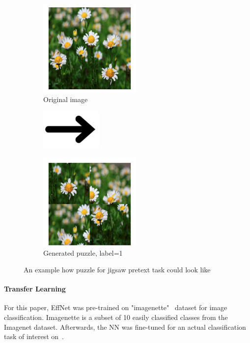 \\
\begin{figure}[h]
    \begin{subfigure}{0.33\textwidth}
        \caption{Original image}
        \includegraphics[width=5cm]{images/dandelion}
    \end{subfigure}
    \begin{subfigure}{0.2\textwidth}
        \includegraphics[width=3cm]{images/arrow}
    \end{subfigure}
    \begin{subfigure}{0.33\textwidth}
        \caption{Generated puzzle, label=1}
        \includegraphics[width=5cm]{images/puzzle}
    \end{subfigure}
    \caption{An example how puzzle for jigsaw pretext task could look like}
    \label{fig:jig-fig}
\end{figure}


\paragraph{Transfer Learning}For this paper, EffNet was pre-trained on "imagenette"~\cite{ImageNette} dataset for image classification.
Imagenette is a subset of 10 easily classified classes from the Imagenet dataset.
Afterwards, the NN was fine-tuned for an actual classification task of interest on~\cite{tfflowers}.

